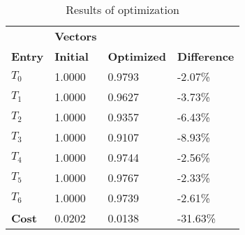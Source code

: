 \begin{table}[h!]
\centering
\begin{tabular}{llll}
\textbf{}      & \cellcolor[HTML]{EFEFEF}\textbf{Vectors} & \textbf{} & \textbf{}         \\
\rowcolor[HTML]{EFEFEF} 
\textbf{Entry} & \textbf{Initial} & \textbf{Optimized} & \textbf{Difference} \\
$T_0$ & 1.0000 & 0.9793 & -2.07\% \\ 
$T_1$ & 1.0000 & 0.9627 & -3.73\% \\ 
$T_2$ & 1.0000 & 0.9357 & -6.43\% \\ 
$T_3$ & 1.0000 & 0.9107 & -8.93\% \\ 
$T_4$ & 1.0000 & 0.9744 & -2.56\% \\ 
$T_5$ & 1.0000 & 0.9767 & -2.33\% \\ 
$T_6$ & 1.0000 & 0.9739 & -2.61\% \\ 
\rowcolor[HTML]{EFEFEF} 
\textbf{Cost}  & 0.0202 & 0.0138 & -31.63\% \\ 
\end{tabular}
\caption{Results of optimization}
\label{tab:OptimizationAnalysis}
\end{table}